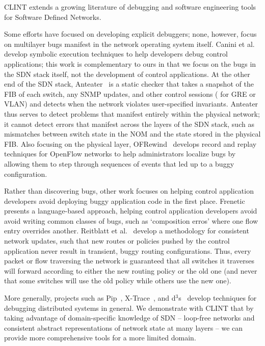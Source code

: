     CLINT extends a growing literature of debugging and software engineering tools for Software Defined Networks.
    
    Some efforts have focused on developing explicit debuggers; none, however, focus on multilayer bugs manifest in the network operating system itself.
    Canini et al.~\cite{canini} develop symbolic execution techniques to help developers debug control applications; this work is complementary to ours in that we focus on the bugs in the SDN stack itself, not the development of control applications. 
    At the other end of the SDN stack, Anteater~\cite{anteater} is a static checker that takes a snapshot of the FIB of each switch, any SNMP updates, and other control sessions (\eg{} for GRE or VLAN) and detects when the network violates user-specified invariants.
    Anteater thus serves to detect problems that manifest entirely within the physical network; it cannot detect errors that manifest across the layers of the SDN stack, such as mismatches between switch state in the NOM and the state stored in the physical FIB.
    Also focusing on the physical layer, OFRewind~\cite{ofrewind} develops record and replay techniques for OpenFlow networks to help administrators localize bugs by allowing them to step through sequences of events that led up to a buggy configuration.

    Rather than  discovering bugs, other work focuses on helping control application developers avoid deploying buggy application code in the first place. 
    Frenetic~\cite{frenetic} presents a language-based approach, helping control application developers avoid avoid writing common classes of bugs, such as `composition erros' where one flow entry overrides another.
    Reitblatt et al.~\cite{consistentupdates}  develop a methodology for consistent network updates, such that new routes or policies pushed by the control application never result in transient, buggy routing configurations.
    Thus, every packet or flow traversing the network is guaranteed that all switches it traverses will forward according to either the new routing policy or the old one (and never that some switches will use the old policy while others use the new one). 

    More generally, projects such as Pip~\cite{pip}, X-Trace~\cite{xtrace}, and d$^3$s~\cite{d3s} develop techniques for debugging distributed systems in general.
    We demonstrate with CLINT that by taking advantage of domain-specific knowledge of SDN -- \eg{} loop-free networks and consistent abstract representations of network state at many layers -- we can provide more comprehensive tools for a more limited domain. 

